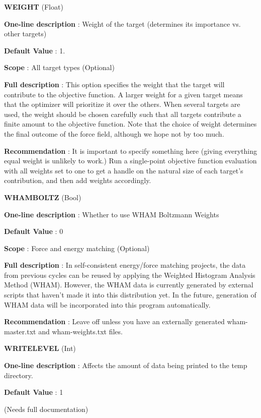 \begin{DoxyItemize}
\item {\bfseries  W\-E\-I\-G\-H\-T } (Float) \par
{\bfseries  One-\/line description }\-: Weight of the target (determines its importance vs. other targets) \par
{\bfseries  Default Value }\-: 1. \par
{\bfseries  Scope }\-: All target types (Optional) \par
{\bfseries  Full description }\-: This option specifies the weight that the target will contribute to the objective function. A larger weight for a given target means that the optimizer will prioritize it over the others. When several targets are used, the weight should be chosen carefully such that all targets contribute a finite amount to the objective function. Note that the choice of weight determines the final outcome of the force field, although we hope not by too much. \par
{\bfseries  Recommendation }\-: It is important to specify something here (giving everything equal weight is unlikely to work.) Run a single-\/point objective function evaluation with all weights set to one to get a handle on the natural size of each target's contribution, and then add weights accordingly.\end{DoxyItemize}
\begin{DoxyItemize}
\item {\bfseries  W\-H\-A\-M\-B\-O\-L\-T\-Z } (Bool) \par
{\bfseries  One-\/line description }\-: Whether to use W\-H\-A\-M Boltzmann Weights \par
{\bfseries  Default Value }\-: 0 \par
{\bfseries  Scope }\-: Force and energy matching (Optional) \par
{\bfseries  Full description }\-: In self-\/consistent energy/force matching projects, the data from previous cycles can be reused by applying the Weighted Histogram Analysis Method (W\-H\-A\-M). However, the W\-H\-A\-M data is currently generated by external scripts that haven't made it into this distribution yet. In the future, generation of W\-H\-A\-M data will be incorporated into this program automatically. \par
{\bfseries  Recommendation }\-: Leave off unless you have an externally generated wham-\/master.\-txt and wham-\/weights.\-txt files.\end{DoxyItemize}
\begin{DoxyItemize}
\item {\bfseries  W\-R\-I\-T\-E\-L\-E\-V\-E\-L } (Int) \par
{\bfseries  One-\/line description }\-: Affects the amount of data being printed to the temp directory. \par
{\bfseries  Default Value }\-: 1 \par
(Needs full documentation)\end{DoxyItemize}

